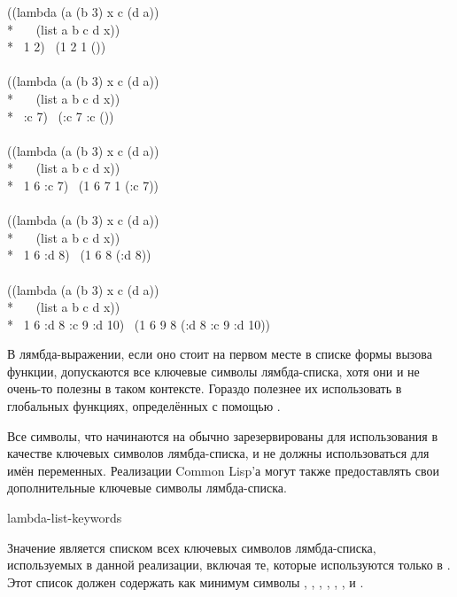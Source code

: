 \begin{lisp}
((lambda (a  (b 3)  x  c (d a)) \\*
~~~(list a b c d x)) \\*
~1 2)   \EV\ (1 2 {\nil} 1 ()) \\
 \\
((lambda (a  (b 3)  x  c (d a)) \\*
~~~(list a b c d x)) \\*
~:c 7)   \EV\ (:c 7 {\nil} :c ()) \\
 \\
((lambda (a  (b 3)  x  c (d a)) \\*
~~~(list a b c d x)) \\*
~1 6 :c 7)   \EV\ (1 6 7 1 (:c 7)) \\
 \\
((lambda (a  (b 3)  x  c (d a)) \\*
~~~(list a b c d x)) \\*
~1 6 :d 8)   \EV\ (1 6 {\nil} 8 (:d 8)) \\
 \\
((lambda (a  (b 3)  x  c (d a)) \\*
~~~(list a b c d x)) \\*
~1 6 :d 8 :c 9 :d 10)   \EV\ (1 6 9 8 (:d 8 :c 9 :d 10))
\end{lisp}

В лямбда-выражении, если оно стоит на первом месте в списке формы вызова функции,
допускаются все ключевые символы лямбда-списка, хотя они и не очень-то полезны в
таком контексте.
Гораздо полезнее их использовать в глобальных функциях, определённых с помощью
.

Все символы, что начинаются на \cd{\&} обычно зарезервированы для использования в
качестве ключевых символов лямбда-списка, и не должны использоваться для имён
переменных.
Реализации Common Lisp'а могут также предоставлять свои дополнительные ключевые
символы лямбда-списка.

\begin{defun}[Константа]
lambda-list-keywords

Значение  является списком всех ключевых символов
лямбда-списка, используемых в данной реализации, включая те, которые
используются только в . Этот список должен содержать как минимум
символы , , , ,
, ,  и .
\end{defun}

